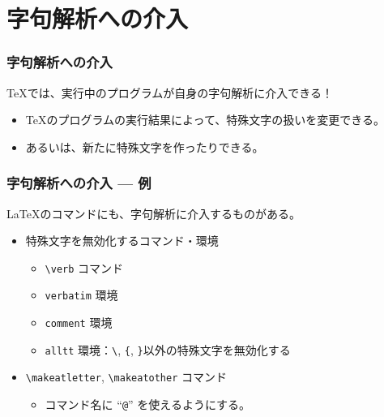 \documentclass{beamer}
\begin{document}
\section{字句解析への介入}
\begin{frame}\frametitle{字句解析への介入}
  \TeX では、実行中のプログラムが自身の字句解析に介入できる！

  \begin{itemize}
  \item \TeX のプログラムの実行結果によって、特殊文字の扱いを変更できる。
  \item あるいは、新たに特殊文字を作ったりできる。
  \end{itemize}

\end{frame}

\begin{frame}[fragile]\frametitle{字句解析への介入 --- 例}
  \LaTeX のコマンドにも、字句解析に介入するものがある。
  \begin{itemize}
  \item 特殊文字を無効化するコマンド・環境
    \begin{itemize}
    \item \verb|\verb| コマンド
    \item \texttt{verbatim} 環境
    \item \texttt{comment} 環境
    \item \texttt{alltt} 環境：\verb|\|, \verb|{|, \verb|}|以外の特殊文字を無効化する
    \end{itemize}
  \item \verb|\makeatletter|, \verb|\makeatother| コマンド
    \begin{itemize}
    \item コマンド名に ``\texttt{@}'' を使えるようにする。
    \end{itemize}
  \end{itemize}
\end{frame}
\end{document}

